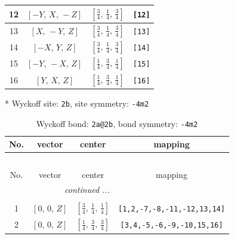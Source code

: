 \documentclass[fleqn,8pt]{jsarticle}
\begin{document}
\begin{longtable}{cccc}
12 & $\left[ - Y,\, X,\, - Z \right]$ & $\left[ \frac{3}{4},\, \frac{1}{4},\, \frac{3}{4} \right]$ & {\tt [12]} \\ \hline
13 & $\left[ X,\, - Y,\, Z \right]$ & $\left[ \frac{3}{4},\, \frac{1}{4},\, \frac{3}{4} \right]$ & {\tt [13]} \\ \hline
14 & $\left[ - X,\, Y,\, Z \right]$ & $\left[ \frac{3}{4},\, \frac{1}{4},\, \frac{3}{4} \right]$ & {\tt [14]} \\ \hline
15 & $\left[ - Y,\, - X,\, Z \right]$ & $\left[ \frac{1}{4},\, \frac{3}{4},\, \frac{1}{4} \right]$ & {\tt [15]} \\ \hline
16 & $\left[ Y,\, X,\, Z \right]$ & $\left[ \frac{1}{4},\, \frac{3}{4},\, \frac{1}{4} \right]$ & {\tt [16]} \\
\end{longtable}
* Wyckoff site: {\tt 2b}, site symmetry: {\tt -4m2}
\renewcommand{\arraystretch}{1.2}
\begin{longtable}{cccc}
\caption{Wyckoff bond: {\tt 2a@2b}, bond symmetry: {\tt -4m2}}
 \\
 \hline \hline
No. & vector & center & mapping \\ \hline \endfirsthead

\multicolumn{3}{l}{\tablename\ \thetable{}} \\
 \hline \hline
No. & vector & center & mapping \\ \hline \endhead

 \hline \hline
\multicolumn{3}{r}{\footnotesize\it continued ...} \\ \endfoot

 \hline \hline
\multicolumn{3}{r}{} \\ \endlastfoot

1 & $\left[ 0,\, 0,\, Z \right]$ & $\left[ \frac{3}{4},\, \frac{1}{4},\, \frac{1}{4} \right]$ & {\tt [1,2,-7,-8,-11,-12,13,14]} \\ \hline
2 & $\left[ 0,\, 0,\, Z \right]$ & $\left[ \frac{1}{4},\, \frac{3}{4},\, \frac{3}{4} \right]$ & {\tt [3,4,-5,-6,-9,-10,15,16]} \\
\end{longtable}
\renewcommand{\arraystretch}{1.2}
\end{document}

